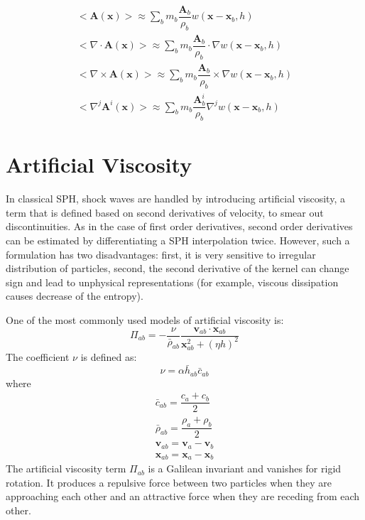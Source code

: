 \begin{align}
<\textbf{A}\left(\textbf{x}\right)> \approx \sum_b m_b \dfrac{\textbf{A}_b}{\rho_b} w\left(\textbf{x}-\textbf{x}_b, h\right) \\
<\nabla \cdot \textbf{A}\left(\textbf{x}\right)> \approx \sum_b m_b \dfrac{\textbf{A}_b}{\rho_b} \cdot \nabla w\left(\textbf{x} - \textbf{x}_b, h\right) \\
<\nabla \times \textbf{A}\left(\textbf{x}\right)> \approx \sum_b m_b \dfrac{\textbf{A}_b}{\rho_b} \times \nabla w\left(\textbf{x} - \textbf{x}_b, h\right) \\
<\nabla^j \textbf{A}^i\left(\textbf{x}\right)> \approx \sum_b m_b \dfrac{\textbf{A}_b^i}{\rho_b} \nabla^j w\left(\textbf{x} - \textbf{x}_b, h\right) 
\label{eq:SPH-vecctor-function}
\end{align}

\section{Artificial Viscosity} \label{sec:artificial-viscosity}
In classical SPH, shock waves are handled by introducing artificial viscosity, a term that is defined based on second derivatives of velocity, to smear out discontinuities. As in the case of first order derivatives, second order derivatives can be estimated by differentiating a SPH interpolation twice. However, such a formulation has two disadvantages: first, it is very sensitive to irregular distribution of particles, second, the second derivative of the kernel can change sign and lead to unphysical representations (for example, viscous dissipation causes decrease of the entropy). 

One of the most commonly used models of artificial viscosity \citep{monaghan1983shock} is:
\begin{equation}
\Pi_{ab}=- \frac{\nu}{\bar{\rho}_{ab}} \dfrac{ \textbf{v}_{ab} \cdot \textbf{x}_{ab}}{\textbf{x}_{ab}^2 + \left(\eta h\right)^2}
\label{eq:art-vis-original}
\end{equation}
The coefficient $\nu$ is defined as:
\begin{equation}
\nu = \alpha \bar{h}_{ab} \bar{c}_{ab}
\end{equation}
where 
\begin{align}
\bar{c}_{ab} = \dfrac{c_a + c_b}{2} \\
\bar{\rho}_{ab} = \dfrac{\rho_a + \rho_b}{2} \\
\textbf{v}_{ab}=\textbf{v}_a-\textbf{v}_b \\
\textbf{x}_{ab}=\textbf{x}_a-\textbf{x}_b
\end{align}
The artificial viscosity term $\Pi_{ab}$ is a Galilean invariant and vanishes for rigid rotation. It produces a repulsive force between two particles when they are approaching each other and an attractive force when they are receding from each other. 

